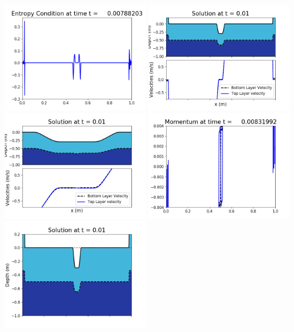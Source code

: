 \documentclass[11pt]{article}
\begin{document}
\vskip 10pt 
\includegraphics[width=0.475\textwidth]{frame0019fig1009.png}
\vskip 10pt 
\includegraphics[width=0.475\textwidth]{frame0020fig1001.png}
\includegraphics[width=0.475\textwidth]{frame0020fig1002.png}
\vskip 10pt 
\includegraphics[width=0.475\textwidth]{frame0020fig1003.png}
\includegraphics[width=0.475\textwidth]{frame0020fig1006.png}
\end{document}
